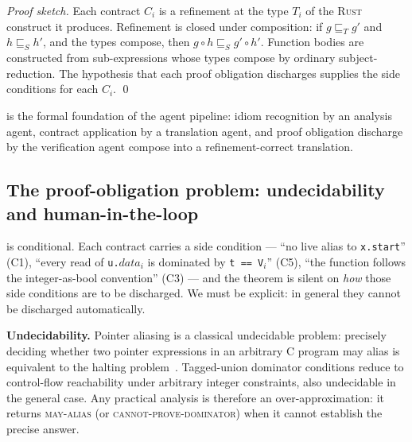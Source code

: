 \documentclass[12pt]{article}
\newcommand{\refines}{\sqsubseteq}
\newcommand{\rust}{\textnormal{\textsc{Rust}}}
\newcommand{\clang}{\textnormal{\textsc{C}}}
\theoremstyle{definition}
\theoremstyle{remark}
\begin{document}
\begin{proof}[Proof sketch]
Each contract \(C_i\) is a refinement at the type \(T_i\) of the \rust{} construct it produces. Refinement is closed under composition: if \(g \refines_{T} g'\) and \(h \refines_{S} h'\), and the types compose, then \(g \circ h \refines_{S} g' \circ h'\). Function bodies are constructed from sub-expressions whose types compose by ordinary subject-reduction. The hypothesis that each proof obligation discharges supplies the side conditions for each \(C_i\). \qed
\end{proof}

 is the formal foundation of the agent pipeline: idiom recognition by an analysis agent, contract application by a translation agent, and proof obligation discharge by the verification agent compose into a refinement-correct translation.

\subsection{The proof-obligation problem: undecidability and human-in-the-loop}
\label{sec:obligations}

 is conditional. Each contract carries a side condition --- ``no live alias to \texttt{x.start}'' (C1), ``every read of \texttt{u.}\(\mathit{data}_i\) is dominated by \texttt{t == V}\(_i\)'' (C5), ``the function follows the integer-as-bool convention'' (C3) --- and the theorem is silent on \emph{how} those side conditions are to be discharged. We must be explicit: in general they cannot be discharged automatically.

\textbf{Undecidability.} Pointer aliasing is a classical undecidable problem: precisely deciding whether two pointer expressions in an arbitrary \clang{} program may alias is equivalent to the halting problem~\cite{landi1992undecidable}. Tagged-union dominator conditions reduce to control-flow reachability under arbitrary integer constraints, also undecidable in the general case. Any practical analysis is therefore an over-approximation: it returns \textsc{may-alias} (or \textsc{cannot-prove-dominator}) when it cannot establish the precise answer.
\end{document}
